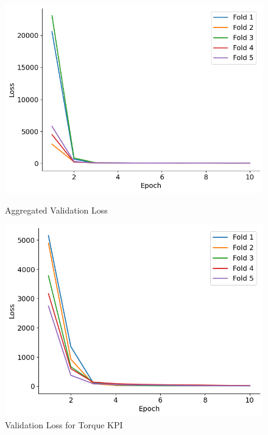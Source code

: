 \documentclass{report} %
\begin{document}
\begin{figure}[H]
    \centering
    \begin{minipage}[b]{0.325\textwidth}
        \includegraphics[width=\textwidth]{./ReportImages/val_loss.png}
        \caption{\centering Aggregated Validation Loss}
        \label{fig:Aggregated Validation Loss}
    \end{minipage}
    \begin{minipage}[b]{0.325\textwidth}
        \includegraphics[width=\textwidth]{./ReportImages/val_loss_y1.png}
        \caption{\centering Validation Loss for Torque \ac{KPI}}
        \label{fig:Validation Loss for Torque Curve}
    \end{minipage}
    \hfill
    \begin{minipage}[b]{0.325\textwidth}

\end{minipage}
\end{figure}
\end{document}
